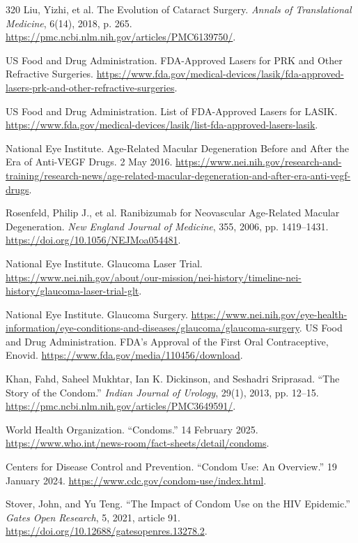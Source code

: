 \documentclass[12pt,oneside]{book}
\begin{document}
\begin{thebibliography}{320}
Liu, Yizhi, et al. The Evolution of Cataract Surgery.
\emph{Annals of Translational Medicine}, 6(14), 2018, p. 265.
\url{https://pmc.ncbi.nlm.nih.gov/articles/PMC6139750/}.

US Food and Drug Administration. FDA-Approved Lasers for PRK and Other
Refractive Surgeries.
\url{https://www.fda.gov/medical-devices/lasik/fda-approved-lasers-prk-and-other-refractive-surgeries}.

US Food and Drug Administration. List of FDA-Approved Lasers for LASIK.
\url{https://www.fda.gov/medical-devices/lasik/list-fda-approved-lasers-lasik}.

National Eye Institute. Age-Related Macular Degeneration Before and After the
Era of Anti-VEGF Drugs. 2 May 2016.
\url{https://www.nei.nih.gov/research-and-training/research-news/age-related-macular-degeneration-and-after-era-anti-vegf-drugs}.

Rosenfeld, Philip J., et al. Ranibizumab for Neovascular Age-Related Macular
Degeneration. \emph{New England Journal of Medicine}, 355, 2006,
pp. 1419--1431.
\url{https://doi.org/10.1056/NEJMoa054481}.

National Eye Institute. Glaucoma Laser Trial.
\url{https://www.nei.nih.gov/about/our-mission/nei-history/timeline-nei-history/glaucoma-laser-trial-glt}.

National Eye Institute. Glaucoma Surgery.
\url{https://www.nei.nih.gov/eye-health-information/eye-conditions-and-diseases/glaucoma/glaucoma-surgery}.
US Food and Drug Administration. FDA's Approval of the First Oral
Contraceptive, Enovid.
\url{https://www.fda.gov/media/110456/download}.

Khan, Fahd, Saheel Mukhtar, Ian K. Dickinson, and Seshadri Sriprasad. ``The
Story of the Condom.'' \emph{Indian Journal of Urology}, 29(1), 2013,
pp. 12--15. \url{https://pmc.ncbi.nlm.nih.gov/articles/PMC3649591/}.

World Health Organization. ``Condoms.'' 14 February 2025.
\url{https://www.who.int/news-room/fact-sheets/detail/condoms}.

Centers for Disease Control and Prevention. ``Condom Use: An Overview.''
19 January 2024. \url{https://www.cdc.gov/condom-use/index.html}.

Stover, John, and Yu Teng. ``The Impact of Condom Use on the HIV Epidemic.''
\emph{Gates Open Research}, 5, 2021, article 91.
\url{https://doi.org/10.12688/gatesopenres.13278.2}.


\end{thebibliography}
\end{document}
